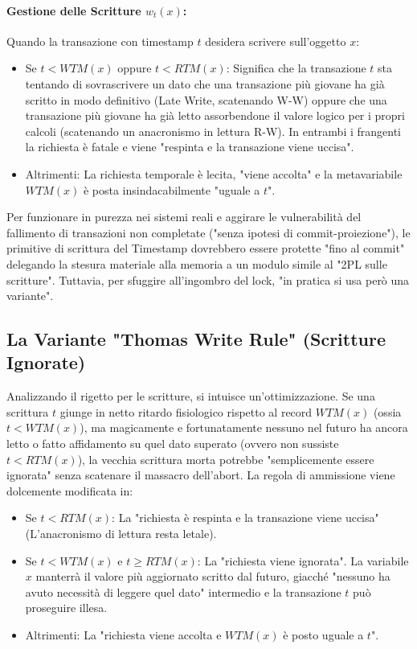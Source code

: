 \paragraph{Gestione delle Scritture $w_t(x)$:}
Quando la transazione con timestamp $t$ desidera scrivere sull'oggetto $x$:
\begin{itemize}
    \item Se $t < WTM(x)$ oppure $t < RTM(x)$: Significa che la transazione $t$ sta tentando di sovrascrivere un dato che una transazione più giovane ha già scritto in modo definitivo (Late Write, scatenando W-W) oppure che una transazione più giovane ha già letto assorbendone il valore logico per i propri calcoli (scatenando un anacronismo in lettura R-W). In entrambi i frangenti la richiesta è fatale e viene "respinta e la transazione viene uccisa".
    \item Altrimenti: La richiesta temporale è lecita, "viene accolta" e la metavariabile $WTM(x)$ è posta insindacabilmente "uguale a $t$".
\end{itemize}

Per funzionare in purezza nei sistemi reali e aggirare le vulnerabilità del fallimento di transazioni non completate ("senza ipotesi di commit-proiezione"), le primitive di scrittura del Timestamp dovrebbero essere protette "fino al commit" delegando la stesura materiale alla memoria a un modulo simile al "2PL sulle scritture". Tuttavia, per sfuggire all'ingombro del lock, "in pratica si usa però una variante".

\subsection{La Variante "Thomas Write Rule" (Scritture Ignorate)}
Analizzando il rigetto per le scritture, si intuisce un'ottimizzazione.
Se una scrittura $t$ giunge in netto ritardo fisiologico rispetto al record $WTM(x)$ (ossia $t < WTM(x)$), ma magicamente e fortunatamente nessuno nel futuro ha ancora letto o fatto affidamento su quel dato superato (ovvero non sussiste $t < RTM(x)$), la vecchia scrittura morta potrebbe "semplicemente essere ignorata" senza scatenare il massacro dell'abort.
La regola di ammissione viene dolcemente modificata in:
\begin{itemize}
    \item Se $t < RTM(x)$: La "richiesta è respinta e la transazione viene uccisa" (L'anacronismo di lettura resta letale).
    \item Se $t < WTM(x)$ e $t \geq RTM(x)$: La "richiesta viene ignorata". La variabile $x$ manterrà il valore più aggiornato scritto dal futuro, giacché "nessuno ha avuto necessità di leggere quel dato" intermedio e la transazione $t$ può proseguire illesa.
    \item Altrimenti: La "richiesta viene accolta e $WTM(x)$ è posto uguale a $t$".
\end{itemize}

